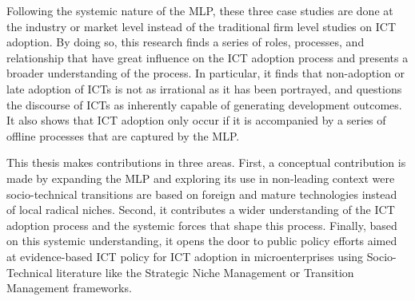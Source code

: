 \documentclass[10pt]{article}
\begin{document}
{Following the systemic nature of the MLP, these three case studies are done at the industry or market level instead of the traditional firm level studies on ICT adoption. By doing so, this research finds a series of roles, processes, and relationship that have great influence on the ICT adoption process and presents a broader understanding of the process. In particular, it finds that non-adoption or late adoption of ICTs is not as irrational as it has been portrayed, and questions the discourse of ICTs as inherently capable of generating development outcomes. It also shows that ICT adoption only occur if it is accompanied by a series of offline processes that are captured by the MLP.

This thesis makes contributions in three areas. First, a conceptual contribution is made by expanding the MLP and exploring its use in non-leading context were socio-technical transitions are based on foreign and mature technologies instead of local radical niches. Second, it contributes a wider understanding of the ICT adoption process and the systemic forces that shape this process. Finally, based on this systemic understanding, it opens the door to public policy efforts aimed at evidence-based ICT policy for ICT adoption in microenterprises using Socio-Technical literature like the Strategic Niche Management or Transition Management frameworks.}
\end{document}
